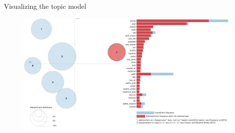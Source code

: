 \documentclass{beamer}
\begin{document}
	\begin{frame}{Visualizing the topic model}

			\begin{figure}[H]
				\begin{center}
					\includegraphics[scale = 0.37]{PyLDAvis_topmodel5}
				\end{center}
			\end{figure}

\end{frame}
\end{document}
